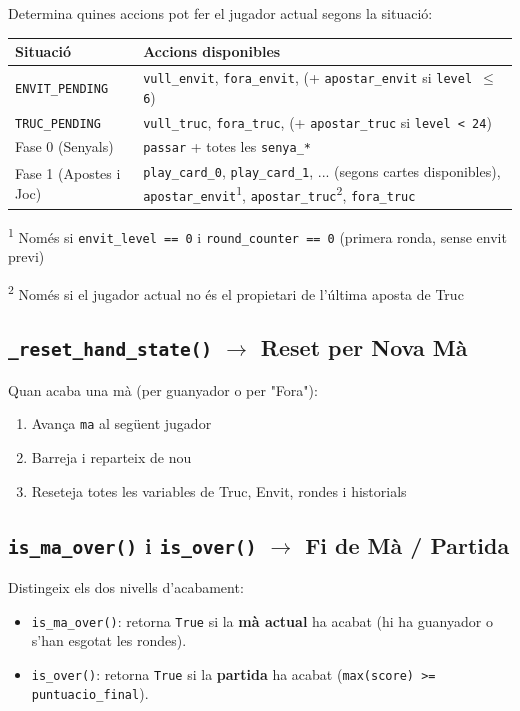 \documentclass[a4paper,11pt]{report}
\begin{document}
Determina quines accions pot fer el jugador actual segons la situació:

\begin{longtable}{|l|p{8cm}|}
\hline
\textbf{Situació} & \textbf{Accions disponibles} \\
\hline
\texttt{ENVIT\_PENDING} & \texttt{vull\_envit}, \texttt{fora\_envit}, (+ \texttt{apostar\_envit} si \texttt{level $\le$ 6}) \\
\texttt{TRUC\_PENDING} & \texttt{vull\_truc}, \texttt{fora\_truc}, (+ \texttt{apostar\_truc} si \texttt{level < 24}) \\
Fase 0 (Senyals) & \texttt{passar} + totes les \texttt{senya\_*} \\
Fase 1 (Apostes i Joc) & \texttt{play\_card\_0}, \texttt{play\_card\_1}, ... (segons cartes disponibles), \texttt{apostar\_envit}\textsuperscript{1}, \texttt{apostar\_truc}\textsuperscript{2}, \texttt{fora\_truc} \\
\hline
\end{longtable}

\textsuperscript{1} Només si \texttt{envit\_level == 0} i \texttt{round\_counter == 0} (primera ronda, sense envit previ)

\textsuperscript{2} Només si el jugador actual no és el propietari de l'última aposta de Truc

\subsection{\texttt{\_reset\_hand\_state()} $\rightarrow$ Reset per Nova Mà}

Quan acaba una mà (per guanyador o per "Fora"):
\begin{enumerate}
    \item Avança \texttt{ma} al següent jugador
    \item Barreja i reparteix de nou
    \item Reseteja totes les variables de Truc, Envit, rondes i historials
\end{enumerate}

\subsection{\texttt{is\_ma\_over()} i \texttt{is\_over()} $\rightarrow$ Fi de Mà / Partida}

Distingeix els dos nivells d'acabament:
\begin{itemize}
    \item \texttt{is\_ma\_over()}: retorna \texttt{True} si la \textbf{mà actual} ha acabat (hi ha guanyador o s'han esgotat les rondes).
    \item \texttt{is\_over()}: retorna \texttt{True} si la \textbf{partida} ha acabat (\texttt{max(score) >= puntuacio\_final}).
\end{itemize}
\end{document}
